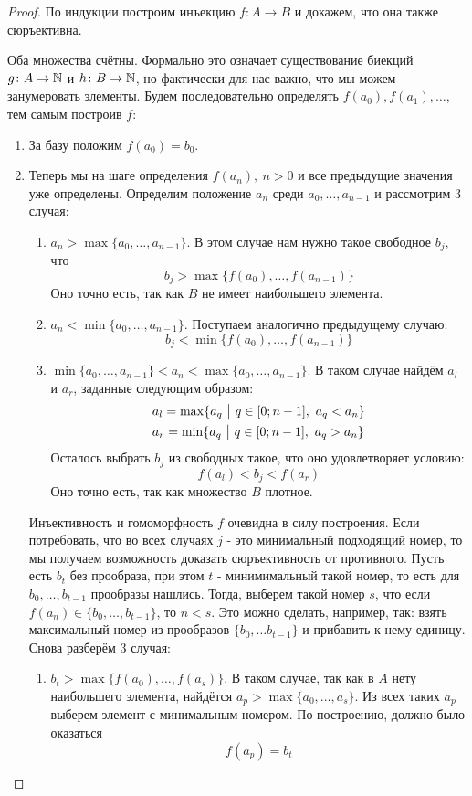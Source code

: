 \begin{proof}
	По индукции построим инъекцию $f \colon A \to B$ и докажем, что она также сюръективна.
	
	Оба множества счётны. Формально это означает существование биекций $g \colon A \to \mathbb{N}$ и $h \colon B \to \mathbb{N}$, но фактически для нас важно, что мы можем занумеровать элементы. Будем последовательно определять $f(a_0), f(a_1), \ldots$, тем самым построив $f$:
	\begin{enumerate}
		\item За базу положим $f(a_0) = b_0$.
		
		\item Теперь мы на шаге определения $f(a_n),\ n > 0$ и все предыдущие значения уже определены. Определим положение $a_n$ среди $a_0, \ldots, a_{n - 1}$ и рассмотрим 3 случая:
		\begin{enumerate}
			\item $a_n > \max \{a_0, \ldots, a_{n - 1}\}$. В этом случае нам нужно такое свободное $b_j$, что
			\[
				b_j > \max \{f(a_0), \ldots, f(a_{n - 1})\}
			\]
			Оно точно есть, так как $B$ не имеет наибольшего элемента.
			
			\item $a_n < \min \{a_0, \ldots, a_{n - 1}\}$. Поступаем аналогично предыдущему случаю:
			\[
				b_j < \min \{f(a_0), \ldots, f(a_{n - 1})\}
			\]
			
			\item $\min \{a_0, \ldots, a_{n - 1}\} < a_n < \max \{a_0, \ldots, a_{n - 1}\}$. В таком случае найдём $a_l$ и $a_r$, заданные следующим образом:
			\begin{align*}
				&{a_l = \max \{a_q \ \big|\  q \in [0; n - 1],\ a_q < a_n\}}
				\\
				&{a_r = \min \{a_q \ \big|\  q \in [0; n - 1],\ a_q > a_n\}}
			\end{align*}
			Осталось выбрать $b_j$ из свободных такое, что оно удовлетворяет условию:
			\[
				f(a_l) < b_j < f(a_r)
			\]
			Оно точно есть, так как множество $B$ плотное.
		\end{enumerate}
	
		Инъективность и гомоморфность $f$ очевидна в силу построения. Если потребовать, что во всех случаях $j$ - это минимальный подходящий номер, то мы получаем возможность доказать сюръективность от противного. Пусть есть $b_t$ без прообраза, при этом $t$ - минимимальный такой номер, то есть для $b_0, \ldots, b_{t - 1}$ прообразы нашлись. Тогда, выберем такой номер $s$, что если $f(a_n) \in \{b_0, \ldots, b_{t - 1}\}$, то $n < s$. Это можно сделать, например, так: взять максимальный номер из прообразов $\{b_0, \ldots b_{t - 1}\}$ и прибавить к нему единицу. Снова разберём 3 случая:
		\begin{enumerate}
			\item $b_t > \max \{f(a_0), \ldots, f(a_s)\}$. В таком случае, так как в $A$ нету наибольшего элемента, найдётся $a_p > \max \{a_0, \ldots, a_s\}$. Из всех таких $a_p$ выберем элемент с минимальным номером. По построению, должно было оказаться
			\[
				f(a_p) = b_t
			\]
			

\end{enumerate}
\end{enumerate}
\end{proof}

